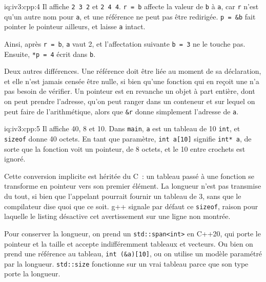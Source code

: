 \begin{solution}{iq:iv3:cpp:4}
Il affiche \texttt{2 3 2} et \texttt{2 4 4}. \texttt{r = b} affecte la valeur de \texttt{b} à \texttt{a}, car \texttt{r} n'est qu'un autre nom pour \texttt{a}, et une référence ne peut pas être redirigée. \texttt{p = \&b} fait pointer le pointeur ailleurs, et laisse \texttt{a} intact.

Ainsi, après \texttt{r = b}, \texttt{a} vaut 2, et l'affectation suivante \texttt{b = 3} ne le touche pas. Ensuite, \texttt{*p = 4} écrit dans \texttt{b}.

Deux autres différences. Une référence doit être liée au moment de sa déclaration, et elle n'est jamais censée être nulle, si bien qu'une fonction qui en reçoit une n'a pas besoin de vérifier. Un pointeur est en revanche un objet à part entière, dont on peut prendre l'adresse, qu'on peut ranger dans un conteneur et sur lequel on peut faire de l'arithmétique, alors que \texttt{\&r} donne simplement l'adresse de \texttt{a}.

\end{solution}

\begin{solution}{iq:iv3:cpp:5}
Il affiche 40, 8 et 10. Dans \texttt{main}, \texttt{a} est un tableau de 10 \texttt{int}, et \texttt{sizeof} donne 40 octets. En tant que paramètre, \texttt{int a[10]} signifie \texttt{int* a}, de sorte que la fonction voit un pointeur, de 8 octets, et le 10 entre crochets est ignoré.

Cette conversion implicite est héritée du C~: un tableau passé à une fonction se transforme en pointeur vers son premier élément. La longueur n'est pas transmise du tout, si bien que l'appelant pourrait fournir un tableau de 3, sans que le compilateur dise quoi que ce soit. g++ signale par défaut ce \texttt{sizeof}, raison pour laquelle le listing désactive cet avertissement sur une ligne non montrée.

Pour conserver la longueur, on prend un \texttt{std::span<int>} en C++20, qui porte le pointeur et la taille et accepte indifféremment tableaux et vecteurs. Ou bien on prend une référence au tableau, \texttt{int (\&a)[10]}, ou on utilise un modèle paramétré par la longueur. \texttt{std::size} fonctionne sur un vrai tableau parce que son type porte la longueur.

\end{solution}

